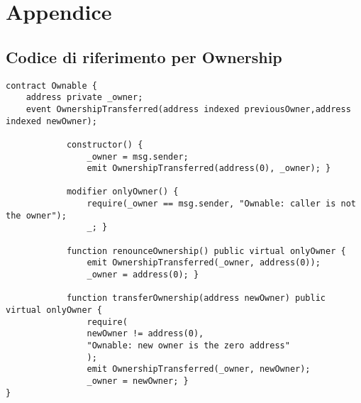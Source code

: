 \appendix
\chapter{Appendice}
\section{Codice di riferimento per Ownership}\label{appendix:ownership}
{\begin{lstlisting}[language=Solidity, caption={Codice di riferimento per Ownership}]
contract Ownable {
	address private _owner;
	event OwnershipTransferred(address indexed previousOwner,address indexed newOwner);
			
			constructor() {
				_owner = msg.sender;
				emit OwnershipTransferred(address(0), _owner); }
			
			modifier onlyOwner() {
				require(_owner == msg.sender, "Ownable: caller is not the owner");
				_; }
			
			function renounceOwnership() public virtual onlyOwner {
				emit OwnershipTransferred(_owner, address(0));
				_owner = address(0); }
			
			function transferOwnership(address newOwner) public virtual onlyOwner {
				require(
				newOwner != address(0),
				"Ownable: new owner is the zero address"
				);
				emit OwnershipTransferred(_owner, newOwner);
				_owner = newOwner; }
}\end{lstlisting}}